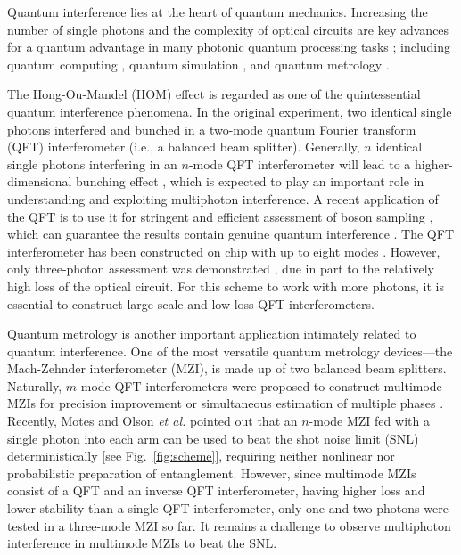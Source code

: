 \documentclass[aps,prl,twocolumn,superscriptaddress]{revtex4-1}
\begin{document}
\maketitle

Quantum interference lies at the heart of quantum mechanics. Increasing the number of single photons and the complexity of optical circuits are key advances for a quantum advantage in many photonic quantum processing tasks \cite{pan2012}; including quantum computing \cite{steane1996,*knill2001,*kok2007}, quantum simulation \cite{aspuru2012,*georgescu2014}, and quantum metrology \cite{lee2002,*giovannetti2011}.

The Hong-Ou-Mandel (HOM) effect \cite{hong1987} is regarded as one of the quintessential quantum interference phenomena. In the original experiment, two identical single photons interfered and bunched in a two-mode quantum Fourier transform (QFT) interferometer (i.e., a balanced beam splitter). Generally, $n$ identical single photons interfering in an $n$-mode QFT interferometer \cite{marek1997,*vourdas2005,*lim2005a} will lead to a higher-dimensional bunching effect \cite{tichy2010,*spagnolo2013,rigovacca2016}, which is expected to play an important role in understanding and exploiting multiphoton interference. A recent application of the QFT is to use it for stringent and efficient assessment of boson sampling \cite{tichy2014a}, which can guarantee the results contain genuine quantum interference \cite{tichy2014b}. The QFT interferometer has been constructed on chip with up to eight modes \cite{crespi2016}. However, only three-photon assessment was demonstrated \cite{carolan2015},  due in part to the relatively high loss of the optical circuit. For this scheme to work with more photons, it is essential to construct large-scale and low-loss QFT interferometers.

Quantum metrology is another important application intimately related to quantum interference. One of the most versatile quantum metrology devices---the Mach-Zehnder interferometer (MZI), is made up of two balanced beam splitters. Naturally, $m$-mode QFT interferometers were proposed to construct multimode MZIs for precision improvement \cite{weihs1996, chaboyer2015} or simultaneous estimation of multiple phases \cite{humphreys2013,ciampini2016,*szczykulska2016}. Recently, Motes and Olson \textit{et al.} \cite{motes2015,olson2016linear} pointed out that an $n$-mode MZI fed with a single photon into each arm can be used to beat the shot noise limit (SNL) deterministically [see Fig.~\ref{fig:scheme}], requiring neither nonlinear nor probabilistic preparation of entanglement. However, since multimode MZIs consist of a QFT and an inverse QFT interferometer, having higher loss and lower stability than a single QFT interferometer, only one \cite{weihs1996} and two \cite{chaboyer2015} photons were tested in a three-mode MZI so far. It remains a challenge to observe multiphoton interference in multimode MZIs to beat the SNL.
\end{document}

